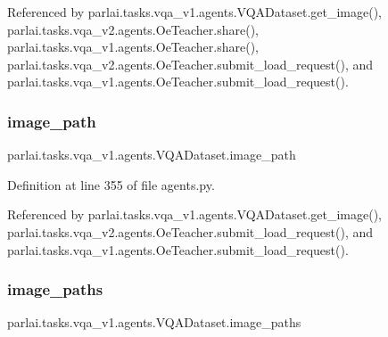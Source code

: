Referenced by parlai.\+tasks.\+vqa\+\_\+v1.\+agents.\+V\+Q\+A\+Dataset.\+get\+\_\+image(), parlai.\+tasks.\+vqa\+\_\+v2.\+agents.\+Oe\+Teacher.\+share(), parlai.\+tasks.\+vqa\+\_\+v1.\+agents.\+Oe\+Teacher.\+share(), parlai.\+tasks.\+vqa\+\_\+v2.\+agents.\+Oe\+Teacher.\+submit\+\_\+load\+\_\+request(), and parlai.\+tasks.\+vqa\+\_\+v1.\+agents.\+Oe\+Teacher.\+submit\+\_\+load\+\_\+request().

\mbox{\label{classparlai_1_1tasks_1_1vqa__v1_1_1agents_1_1VQADataset_a479628f7fc35bd099d3d2b97731f7d60}} 
\subsubsection{\texorpdfstring{image\+\_\+path}{image\_path}}
{\footnotesize\ttfamily parlai.\+tasks.\+vqa\+\_\+v1.\+agents.\+V\+Q\+A\+Dataset.\+image\+\_\+path}



Definition at line 355 of file agents.\+py.



Referenced by parlai.\+tasks.\+vqa\+\_\+v1.\+agents.\+V\+Q\+A\+Dataset.\+get\+\_\+image(), parlai.\+tasks.\+vqa\+\_\+v2.\+agents.\+Oe\+Teacher.\+submit\+\_\+load\+\_\+request(), and parlai.\+tasks.\+vqa\+\_\+v1.\+agents.\+Oe\+Teacher.\+submit\+\_\+load\+\_\+request().

\mbox{\label{classparlai_1_1tasks_1_1vqa__v1_1_1agents_1_1VQADataset_abf93afc18920fbcda9fb752cd9a9ffd3}} 
\subsubsection{\texorpdfstring{image\+\_\+paths}{image\_paths}}
{\footnotesize\ttfamily parlai.\+tasks.\+vqa\+\_\+v1.\+agents.\+V\+Q\+A\+Dataset.\+image\+\_\+paths}




